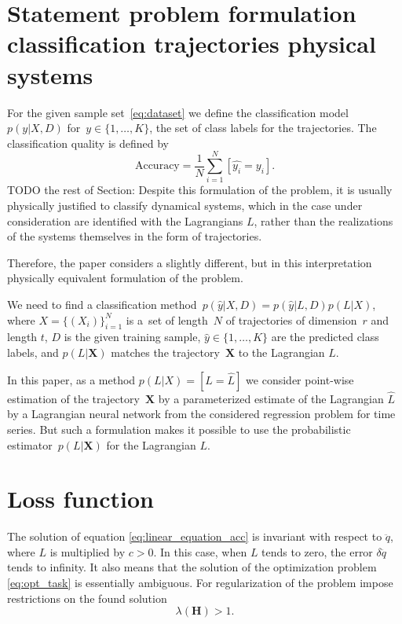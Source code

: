 \documentclass[12pt]{paper}
\begin{document}
\section{Statement problem formulation classification trajectories physical systems} %
For the given sample set~\eqref{eq:dataset} we define the classification model~$p({y}|X, D)$ for~${y} \in \{1,\dots,K\}$, the set of  class labels for the trajectories. The classification quality is defined by 
\[
\text{Accuracy} = \frac{1}{N} \sum_{i = 1}^N \left[\hat{y_i} = y_i\right].
\]
TODO the rest of Section: Despite this formulation of the problem, it is usually physically justified to classify
dynamical systems, which in the case under consideration are identified with the Lagrangians $L$, rather than the realizations of the systems themselves in the form of trajectories.

Therefore, the paper considers a slightly different, but in this interpretation physically
equivalent formulation of the problem.

We need to find a classification method~$p(\hat{y}|X, D) = p(\hat{y}|L, D)p(L|X)$, where $X = \{(X_i)\}_{i=1}^N$ is a~set of length~$N$ of trajectories of dimension~$r$ and length $t$, $D$ is the given training sample, $\hat{y} \in \{1,\dots, K\}$ are the predicted class labels, and $p(L|\mathbf{X})$ matches the trajectory~$\mathbf{X}$ to the Lagrangian $L$.

In this paper, as a method $p(L|X) = [L = \hat{L}]$ we consider point-wise estimation of the
trajectory~$\mathbf{X}$ by a parameterized estimate of the Lagrangian $\hat{L}$  by a Lagrangian neural network from the considered regression problem for time series. But such a formulation makes
it possible to use the probabilistic estimator~$p(L|\mathbf{X})$ for the Lagrangian $L$.

\section{Loss function}
The solution of equation \eqref{eq:linear_equation_acc} is invariant with respect to $\ddot{q}$, where $L$ is multiplied by $c > 0$. In this case, when $L$ tends to zero, the error $\delta\ddot{q}$ tends to infinity. It also means that the solution of the optimization problem \eqref{eq:opt_task} is essentially ambiguous. For regularization of the problem impose restrictions on the found solution
\begin{equation}\label{eq:opt_task_rest}
    \lambda \left(\mathbf{H}\right) > 1.
\end{equation}
\end{document}
